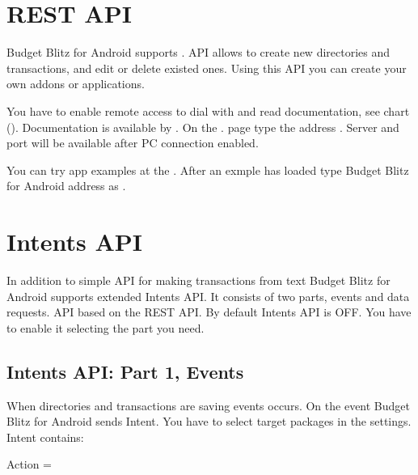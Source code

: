 \documentclass[a4paper,10pt,english]{sphinxmanual}
\begin{document}
\section{REST API}
\label{\detokenize{api:rest-api}}\label{\detokenize{api:sub-chapter-rest-api}}
Budget Blitz for Android supports . API allows to create new directories and transactions, and edit or delete existed ones. Using
this API you can create your own addons or applications.

You have to enable remote access to dial with  and read documentation, see chart {\hyperref[\detokenize{remote-access:chapter-remote-access}]{}} ().
Documentation is available by . On the . page type the address  .
Server and port will be available after PC connection enabled.

You can try app examples at the . After an exmple has loaded type Budget Blitz for Android address as .


\section{Intents API}
\label{\detokenize{api:intents-api}}
In addition to simple API for making transactions from text Budget Blitz for Android supports extended Intents API. It consists of two parts,
events and data requests. API based on the REST API. By default Intents API is OFF. You have to enable it
selecting the part you need.


\subsection{Intents API: Part 1, Events}
\label{\detokenize{api:intents-api-part-1-events}}
When directories and transactions are saving events occurs. On the event Budget Blitz for Android sends Intent. You have to select target
packages in the settings. Intent contains:

Action = 
\end{document}
